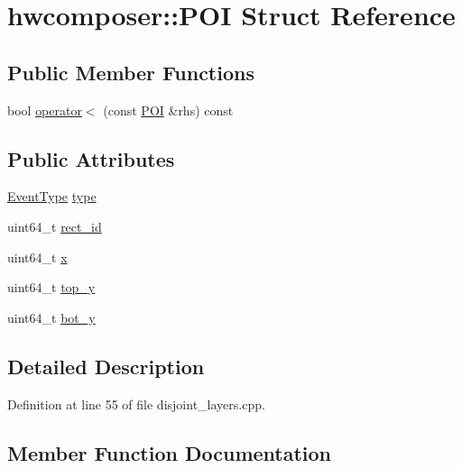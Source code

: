 \hypertarget{structhwcomposer_1_1POI}{}\section{hwcomposer\+:\+:P\+OI Struct Reference}
\label{structhwcomposer_1_1POI}
\subsection*{Public Member Functions}
\begin{DoxyCompactItemize}
\item 
bool \mbox{\hyperlink{structhwcomposer_1_1POI_a0c8b590ebbfe74223058b404dae8b755}{operator$<$}} (const \mbox{\hyperlink{structhwcomposer_1_1POI}{P\+OI}} \&rhs) const
\end{DoxyCompactItemize}
\subsection*{Public Attributes}
\begin{DoxyCompactItemize}
\item 
\mbox{\hyperlink{namespacehwcomposer_a4600de8fd807f9d693b865758557d612}{Event\+Type}} \mbox{\hyperlink{structhwcomposer_1_1POI_acad56a09787f6dffa53a2e86e403d256}{type}}
\item 
uint64\+\_\+t \mbox{\hyperlink{structhwcomposer_1_1POI_a1140eb53d6ffdc71b5964b60d112ece3}{rect\+\_\+id}}
\item 
uint64\+\_\+t \mbox{\hyperlink{structhwcomposer_1_1POI_ae6dc8defbc2baa83d67320f7344ffea2}{x}}
\item 
uint64\+\_\+t \mbox{\hyperlink{structhwcomposer_1_1POI_ab841e57da5dd29224f07cdeb1536a9b1}{top\+\_\+y}}
\item 
uint64\+\_\+t \mbox{\hyperlink{structhwcomposer_1_1POI_ab1986e724a142f17db1f4acf94eaff7a}{bot\+\_\+y}}
\end{DoxyCompactItemize}


\subsection{Detailed Description}


Definition at line 55 of file disjoint\+\_\+layers.\+cpp.



\subsection{Member Function Documentation}
\mbox{\label{structhwcomposer_1_1POI_a0c8b590ebbfe74223058b404dae8b755}} 
